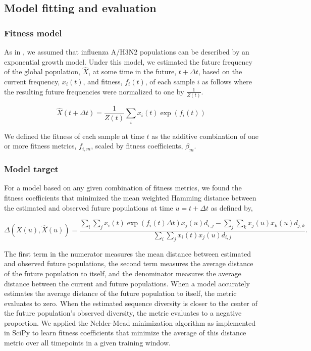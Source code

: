 \subsection*{Model fitting and evaluation}

\subsubsection*{Fitness model}

As in \cite{Luksza:2014hj}, we assumed that influenza A/H3N2 populations can be described by an exponential growth model.
Under this model, we estimated the future frequency of the global population, $\hat{X}$, at some time in the future, $t + \Delta{t}$, based on the current frequency, $x_{i}(t)$, and fitness, $f_{i}(t)$, of each sample $i$ as follows where the resulting future frequencies were normalized to one by $\frac{1}{Z(t)}$.

$$
\hat{X}(t + \Delta{t}) = \frac{1}{Z(t)}\sum_{i}x_{i}(t)\exp(f_{i}(t))
$$

We defined the fitness of each sample at time $t$ as the additive combination of one or more fitness metrics, $f_{i,m}$, scaled by fitness coefficients, $\beta_{m}$.

\subsubsection*{Model target}

For a model based on any given combination of fitness metrics, we found the fitness coefficients that minimized the mean weighted Hamming distance between the estimated and observed future populations at time $u = t + \Delta{t}$ as defined by,

$$
\Delta(X(u), \hat{X}(u)) = \frac{\sum_{i}\sum_{j}x_{i}(t)\exp(f_{i}(t)\Delta{t})x_{j}(u)d_{i,j} - \sum_{j}\sum_{k}x_{j}(u)x_{k}(u)d_{j,k}}{\sum_{i}\sum_{j}x_{i}(t)x_{j}(u)d_{i,j}}.
$$

The first term in the numerator measures the mean distance between estimated and observed future populations, the second term measures the average distance of the future population to itself, and the denominator measures the average distance between the current and future populations.
When a model accurately estimates the average distance of the future population to itself, the metric evaluates to zero.
When the estimated sequence diversity is closer to the center of the future population's observed diversity, the metric evaluates to a negative proportion.
We applied the Nelder-Mead minimization algorithm as implemented in SciPy \cite{SciPy} to learn fitness coefficients that minimize the average of this distance metric over all timepoints in a given training window.

